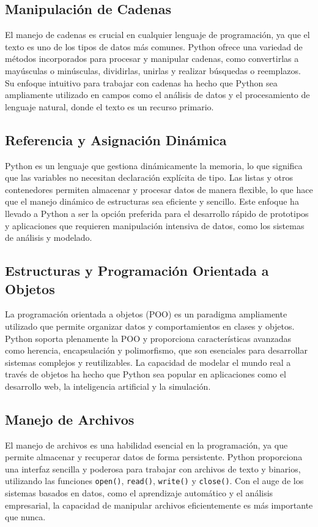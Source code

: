 \documentclass[conference]{IEEEtran}
\begin{document}
\subsection{Manipulación de Cadenas}
El manejo de cadenas es crucial en cualquier lenguaje de programación, ya que el texto es uno de los tipos de datos más comunes. Python ofrece una variedad de métodos incorporados para procesar y manipular cadenas, como convertirlas a mayúsculas o minúsculas, dividirlas, unirlas y realizar búsquedas o reemplazos. Su enfoque intuitivo para trabajar con cadenas ha hecho que Python sea ampliamente utilizado en campos como el análisis de datos y el procesamiento de lenguaje natural, donde el texto es un recurso primario.


\subsection{Referencia y Asignación Dinámica}
Python es un lenguaje que gestiona dinámicamente la memoria, lo que significa que las variables no necesitan declaración explícita de tipo. Las listas y otros contenedores permiten almacenar y procesar datos de manera flexible, lo que hace que el manejo dinámico de estructuras sea eficiente y sencillo. Este enfoque ha llevado a Python a ser la opción preferida para el desarrollo rápido de prototipos y aplicaciones que requieren manipulación intensiva de datos, como los sistemas de análisis y modelado.


\subsection{Estructuras y Programación Orientada a Objetos}
La programación orientada a objetos (POO) es un paradigma ampliamente utilizado que permite organizar datos y comportamientos en clases y objetos. Python soporta plenamente la POO y proporciona características avanzadas como herencia, encapsulación y polimorfismo, que son esenciales para desarrollar sistemas complejos y reutilizables. La capacidad de modelar el mundo real a través de objetos ha hecho que Python sea popular en aplicaciones como el desarrollo web, la inteligencia artificial y la simulación.


\subsection{Manejo de Archivos}
El manejo de archivos es una habilidad esencial en la programación, ya que permite almacenar y recuperar datos de forma persistente. Python proporciona una interfaz sencilla y poderosa para trabajar con archivos de texto y binarios, utilizando las funciones \texttt{open()}, \texttt{read()}, \texttt{write()} y \texttt{close()}. Con el auge de los sistemas basados en datos, como el aprendizaje automático y el análisis empresarial, la capacidad de manipular archivos eficientemente es más importante que nunca.
\end{document}
